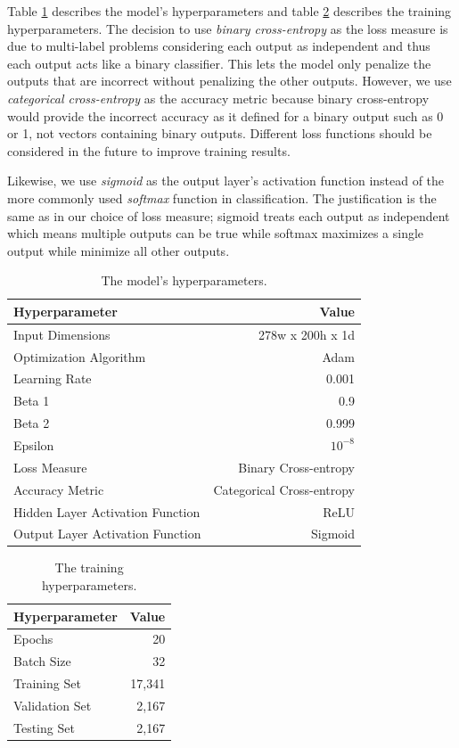 \documentclass[a4paper, 10pt, conference]{ieeeconf}      %
\begin{document}
Table \ref{modelHyperparams} describes the model's hyperparameters and table \ref{trainHyperparams} describes the training hyperparameters. The decision to use \textit{binary cross-entropy} as the loss measure is due to multi-label problems considering each output as independent and thus each output acts like a binary classifier. This lets the model only penalize the outputs that are incorrect without penalizing the other outputs. However, we use \textit{categorical cross-entropy} as the accuracy metric because binary cross-entropy would provide the incorrect accuracy as it defined for a binary output such as 0 or 1, not vectors containing binary outputs. Different loss functions should be considered in the future to improve training results.

Likewise, we use \textit{sigmoid} as the output layer's activation function instead of the more commonly used \textit{softmax} function in classification. The justification is the same as in our choice of loss measure; sigmoid treats each output as independent which means multiple outputs can be true while softmax maximizes a single output while minimize all other outputs.

\begin{table}
	\centering
	\caption{The model's hyperparameters.}
	\label{modelHyperparams}
	\begin{tabular}{@{}lr@{}}
		\toprule
		Hyperparameter & Value \\
		\midrule
		Input Dimensions & 278w x 200h x 1d \\
		Optimization Algorithm & Adam \\
		Learning Rate & 0.001 \\
		Beta 1 & 0.9 \\
		Beta 2 & 0.999 \\
		Epsilon & $10^{-8}$ \\
		Loss Measure & Binary Cross-entropy \\
		Accuracy Metric & Categorical Cross-entropy \\
		Hidden Layer Activation Function & ReLU \\
		Output Layer Activation Function & Sigmoid \\
		\bottomrule
	\end{tabular}
\end{table}

\begin{table}
	\centering
	\caption{The training hyperparameters.}
	\label{trainHyperparams}
	\begin{tabular}{@{}lr@{}}
		\toprule
		Hyperparameter & Value \\
		\midrule
		Epochs & 20 \\
		Batch Size & 32 \\
		Training Set & 17,341 \\
		Validation Set & 2,167 \\
		Testing Set & 2,167 \\
		\bottomrule
	\end{tabular}
\end{table}
\end{document}
